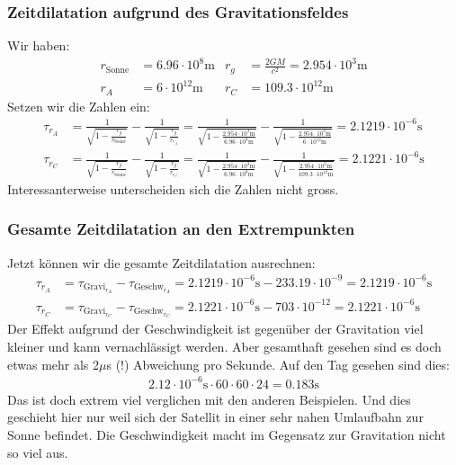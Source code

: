 \begin{refsection}
\subsubsection{Zeitdilatation aufgrund des Gravitationsfeldes}
Wir haben:
\begin{align*}
r_{\text{Sonne}} &= 6.96 \cdot 10^8\text{m} & r_g &= \frac{2GM}{c^2} = 2.954 \cdot 10^3\text{m}
\\
r_A & = 6\cdot 10^{12}\text{m} & r_C &= 109.3\cdot 10^{12}\text{m}
\end{align*}
Setzen wir die Zahlen ein:
\begin{align*}
\tau_{r_A} &= \frac{1}{\sqrt{\displaystyle 1-\frac{r_g}{r_{\text{Sonne}}}}} - \frac{1}{\sqrt{\displaystyle 1-\frac{r_g}{r_{r_A}}}} =  
\frac{1}{\sqrt{\displaystyle 1-\frac{2.954 \cdot 10^3\text{m}}{6.96 \cdot 10^8\text{m}}}} - \frac{1}{\sqrt{\displaystyle 1-\frac{2.954 \cdot 10^3\text{m}}{ 6\cdot 10^{12}\text{m} }}} = 2.1219 \cdot 10^{-6}\text{s}
\\
\tau_{r_C} &= \frac{1}{\sqrt{\displaystyle 1-\frac{r_g}{r_{\text{Sonne}}}}} - \frac{1}{\sqrt{\displaystyle 1-\frac{r_g}{r_{r_C}}}} =  
\frac{1}{\sqrt{\displaystyle 1-\frac{2.954 \cdot 10^3\text{m}}{6.96 \cdot 10^8\text{m}}}} - \frac{1}{\sqrt{\displaystyle 1-\frac{2.954 \cdot 10^3\text{m}}{ 109.3\cdot 10^{12}\text{m} }}} = 2.1221 \cdot 10^{-6}\text{s}
\end{align*}
Interessanterweise unterscheiden sich die Zahlen nicht gross.

\subsubsection{Gesamte Zeitdilatation an den Extrempunkten}
Jetzt können wir die gesamte Zeitdilatation ausrechnen:
\begin{align*}
\tau_{r_A} & = \tau_{\text{Gravi}_{r_A}} - \tau_{\text{Geschw}_{r_A}} = 2.1219 \cdot 10^{-6}\text{s} - 233.19 \cdot 10^{-9} = 2.1219 \cdot 10^{-6}\text{s}
\\
\tau_{r_C} & = \tau_{\text{Gravi}_{r_C}} - \tau_{\text{Geschw}_{r_C}} = 2.1221 \cdot 10^{-6}\text{s} - 703 \cdot 10^{-12} = 2.1221 \cdot 10^{-6}\text{s}
\end{align*}
Der Effekt aufgrund der Geschwindigkeit ist gegenüber der Gravitation viel kleiner und kann vernachlässigt werden. Aber gesamthaft gesehen sind es doch etwas mehr als 2$\mu$s (!) Abweichung pro Sekunde. Auf den Tag gesehen sind dies:
\begin{align*}
2.12 \cdot 10^{-6}\text{s} \cdot 60 \cdot 60 \cdot 24 = 0.183\text{s}
\end{align*}
Das ist doch extrem viel verglichen mit den anderen Beispielen. Und dies geschieht hier nur weil sich der Satellit in einer sehr nahen Umlaufbahn zur Sonne befindet. Die Geschwindigkeit macht im Gegensatz zur Gravitation nicht so viel aus. 

\printbibliography[heading=subbibliography]
\end{refsection}
